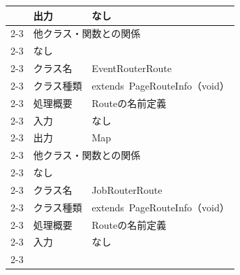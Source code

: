 \begin{longtable}{|c|l|l|}
                            & 出力                                                & なし                                            \\ \cline{2-3}
                            & \multicolumn{2}{l|}{他クラス・関数との関係}                                                                  \\ \cline{2-3}
                            & \multicolumn{2}{p{14cm}|}{なし}                                                                     \\ \cline{2-3}
                            & クラス名                                              & EventRouterRoute                              \\ \cline{2-3}
                            & クラス種類                                             & extends\ PageRouteInfo（void）                  \\ \cline{2-3}
                            & 処理概要                                              & \multicolumn{1}{p{12cm}|}{Routeの名前定義}         \\ \cline{2-3}
                            & 入力                                                & なし                                            \\ \cline{2-3}
                            & 出力                                                & Map                                           \\ \cline{2-3}
                            & \multicolumn{2}{l|}{他クラス・関数との関係}                                                                  \\ \cline{2-3}
                            & \multicolumn{2}{p{14cm}|}{なし}                                                                     \\ \cline{2-3}
                            & クラス名                                              & JobRouterRoute                                \\ \cline{2-3}
                            & クラス種類                                             & extends\ PageRouteInfo（void）                  \\ \cline{2-3}
                            & 処理概要                                              & \multicolumn{1}{p{12cm}|}{Routeの名前定義}         \\ \cline{2-3}
                            & 入力                                                & なし                                            \\ \cline{2-3}

\end{longtable}
